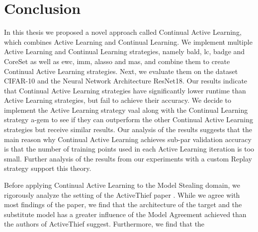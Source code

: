
\chapter{Conclusion}
\label{ch:Conclusion}
In this thesis we proposed a novel approach called Continual Active Learning, which combines Active Learning and Continual Learning. 
We implement multiple Active Learning and Continual Learning strategies, namely \gls{bald}, \gls{lc}, \gls{badge} and CoreSet as well
as \gls{ewc}, \gls{imm}, \gls{alasso} and \gls{mas}, and combine them to create Continual Active Learning strategies. Next, we 
evaluate them on the dataset CIFAR-10 and the Neural Network Architecture ResNet18. Our results indicate that Continual Active Learning
strategies have significantly lower runtime than Active Learning strategies, but fail to achieve their accuracy. We decide to implement
the Active Learning strategy \gls{vaal} along with the Continual Learning strategy \gls{a-gem} to see if they can outperform the other
Continual Active Learning strategies but receive similar results. Our analysis of the results suggests that the main reason why Continual
Active Learning achieves sub-par validation accuracy is that the number of training points used in each Active Learning iteration is too
small. Further analysis of the results from our experiments with a custom Replay strategy support this theory. \par
Before applying Continual Active Learning to the Model Stealing domain, we rigorously analyze the setting of the ActiveThief paper
\cite{pal2020activethief}. While we agree with most findings of the paper, we find that the architecture of the target and the substitute
model has a greater influence of the Model Agreement achieved than the authors of ActiveThief suggest. Furthermore, we find that the
